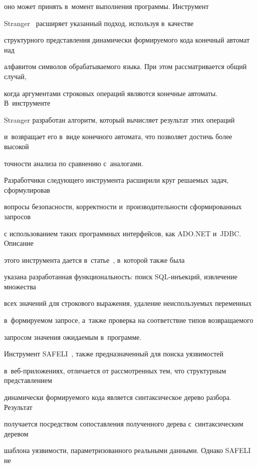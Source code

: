 оно может принять в~момент выполнения программы. Инструмент 


Stranger~\cite{Stranger} расширяет указанный подход, используя в~качестве 


структурного представления динамически формируемого кода конечный автомат над 


алфавитом символов обрабатываемого языка. При этом рассматривается общий случай, 


когда аргументами строковых операций являются конечные автоматы. В~инструменте 


Stranger разработан алгоритм, который вычисляет результат этих операций 


и~возвращает его в~виде конечного автомата, что позволяет достичь более высокой 


точности анализа по сравнению с~аналогами.





Разработчики следующего инструмента расширили круг решаемых задач, сформулировав 


вопросы  безопасности, корректности и~производительности сформированных запросов 


с использованием таких программных интерфейсов, как ADO.NET и~JDBC. Описание 


этого инструмента дается в~статье~\cite{StaticFrame}, в~которой также была 


указана разработанная функциональность: поиск SQL-инъ\-ек\-ций, извлечение множества 


всех значений для строкового выражения, удаление неиспользуемых переменных 


в~формируемом запросе, а~также проверка на соответствие типов возвращаемого 


запросом значения ожидаемым в~программе.





Инструмент SAFELI~\cite{SAFELI}, также предназначенный для поиска уязвимостей 


в~веб-при\-ло\-же\-ни\-ях, отличается от рассмотренных тем, что структурным представлением 


динамически формируемого кода является синтаксическое дерево разбора. Результат 


получается посредством сопоставления полученного дерева с~синтаксическим деревом 


шаблона уязвимости, параметризованного реальными данными. Однако SAFELI не 



